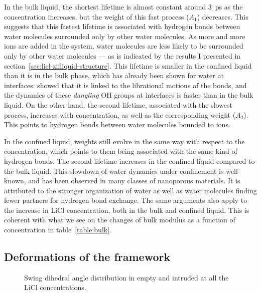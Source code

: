 \documentclass[thesis]{subfiles}
\begin{document}
In the bulk liquid, the shortest lifetime is almost constant around \SI{3}{ps}
as the concentration increases, but the weight of this fast process ($A_1$)
decreases. This suggests that this fastest lifetime is associated with hydrogen
bonds between water molecules surrounded only by other water molecules. As more
and more ions are added in the system, water molecules are less likely to be
surrounded only by other water molecules --- as is indicated by the results I
presented in section~\ref{sec:licl-zifliquid-structure}. This lifetime is
smaller in the confined liquid than it is in the bulk phase, which has already
been shown for water at interfaces: \citeauthor{Fogarty2014}\cite{Fogarty2014}
showed that it is linked to the librational motions of the  bonds, and
the dynamics of these \emph{dangling} OH groups at interfaces is faster than in
the bulk liquid\cite{Scatena2001}. On the other hand, the second lifetime,
associated with the slowest process, increases with concentration, as well as the
corresponding weight ($A_2$). This points to hydrogen bonds between water
molecules bounded to ions.

In the confined liquid, weights still evolve in the same way with respect to the
concentration, which points to them being associated with the same kind of
hydrogen bonds. The second lifetime increases in the confined liquid compared to
the bulk liquid. This slowdown of water dynamics under confinement is
well-known\cite{Fogarty2014}, and has been observed in many classes of
nanoporous materials\cite{Jeffery2004, RomeroVargasCastrillon2009, Haigis2013,
Scalfi2018}. It is attributed to the stronger organization of water as well as
water molecules finding fewer partners for hydrogen bond exchange. The same
arguments also apply to the increase in LiCl concentration, both in the bulk and
confined liquid. This is coherent with what we see on the changes of bulk
modulus as a function of concentration in table~\ref{table:bulk}.

\subsection{Deformations of the framework}
\label{sec:licl-zifdeformation}

\begin{figure}[ht]
    \centering
    
    \caption{Swing dihedral angle distribution in empty and intruded  at
    all the LiCl concentrations.}
    \label{fig:licl-zif:dihedrals}
\end{figure}
\end{document}
